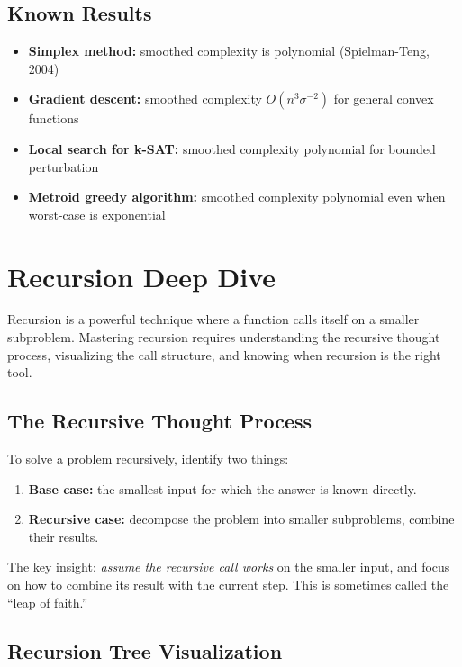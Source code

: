 \subsection{Known Results}

\begin{itemize}
\item \textbf{Simplex method:} smoothed complexity is polynomial (Spielman-Teng, 2004)
\item \textbf{Gradient descent:} smoothed complexity $O(n^{3} \sigma^{-2})$ for general convex functions
\item \textbf{Local search for k-SAT:} smoothed complexity polynomial for bounded perturbation
\item \textbf{Metroid greedy algorithm:} smoothed complexity polynomial even when worst-case is exponential
\end{itemize}

\section{Recursion Deep Dive}

Recursion is a powerful technique where a function calls itself on a smaller subproblem. Mastering recursion requires understanding the recursive thought process, visualizing the call structure, and knowing when recursion is the right tool.

\subsection{The Recursive Thought Process}

To solve a problem recursively, identify two things:
\begin{enumerate}
\item \textbf{Base case:} the smallest input for which the answer is known directly.
\item \textbf{Recursive case:} decompose the problem into smaller subproblems, combine their results.
\end{enumerate}

The key insight: \textit{assume the recursive call works} on the smaller input, and focus on how to combine its result with the current step. This is sometimes called the ``leap of faith.''

\subsection{Recursion Tree Visualization}

